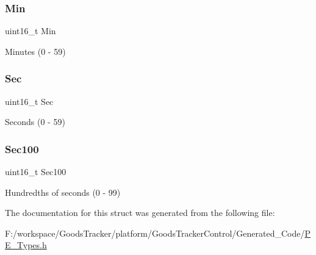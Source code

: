 \subsubsection{\texorpdfstring{Min}{Min}}
{\footnotesize\ttfamily uint16\+\_\+t Min}

Minutes (0 -\/ 59) \mbox{\label{struct_l_d_d___time_date___t_time_rec_a2da653b2fd16ee071ec050945848fc1d}} 
\subsubsection{\texorpdfstring{Sec}{Sec}}
{\footnotesize\ttfamily uint16\+\_\+t Sec}

Seconds (0 -\/ 59) \mbox{\label{struct_l_d_d___time_date___t_time_rec_a408d3a938e468be68cc1fc9c88a28470}} 
\subsubsection{\texorpdfstring{Sec100}{Sec100}}
{\footnotesize\ttfamily uint16\+\_\+t Sec100}

Hundredths of seconds (0 -\/ 99) 

The documentation for this struct was generated from the following file\+:\begin{DoxyCompactItemize}
\item 
F\+:/workspace/\+Goods\+Tracker/platform/\+Goods\+Tracker\+Control/\+Generated\+\_\+\+Code/\hyperlink{_p_e___types_8h}{P\+E\+\_\+\+Types.\+h}\end{DoxyCompactItemize}
